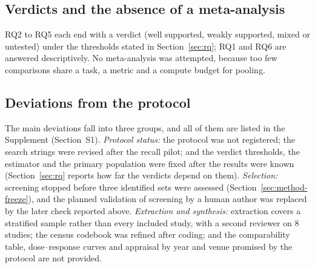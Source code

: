 \subsection{Verdicts and the absence of a meta-analysis}
\label{sec:method-synthesis}
RQ2 to RQ5 each end with a verdict (well supported, weakly supported, mixed or untested) under the thresholds stated in Section~\ref{sec:rq}; RQ1 and RQ6 are answered descriptively. No meta-analysis was attempted, because too few comparisons share a task, a metric and a compute budget for pooling.

\subsection{Deviations from the protocol}
\label{sec:method-deviations}
The main deviations fall into three groups, and all of them are listed in the Supplement (Section~S1). \emph{Protocol status:} the protocol was not registered; the search strings were revised after the recall pilot; and the verdict thresholds, the estimator and the primary population were fixed after the results were known (Section~\ref{sec:rq} reports how far the verdicts depend on them). \emph{Selection:} screening stopped before three identified sets were assessed (Section~\ref{sec:method-freeze}), and the planned validation of screening by a human author was replaced by the later check reported above. \emph{Extraction and synthesis:} extraction covers a stratified sample rather than every included study, with a second reviewer on 8 studies; the census codebook was refined after coding; and the comparability table, dose--response curves and appraisal by year and venue promised by the protocol are not provided.
